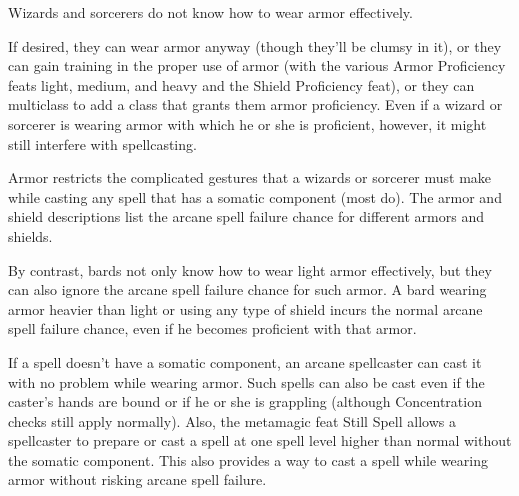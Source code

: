 Wizards and sorcerers do not know how to wear armor effectively.

If desired, they can wear armor anyway (though they'll be clumsy in it), or they can gain training in the proper use of armor (with the various Armor Proficiency feats light, medium, and heavy and the Shield Proficiency feat), or they can multiclass to add a class that grants them armor proficiency. Even if a wizard or sorcerer is wearing armor with which he or she is proficient, however, it might still interfere with spellcasting.

Armor restricts the complicated gestures that a wizards or sorcerer must make while casting any spell that has a somatic component (most do). The armor and shield descriptions list the arcane spell failure chance for different armors and shields.

By contrast, bards not only know how to wear light armor effectively, but they can also ignore the arcane spell failure chance for such armor. A bard wearing armor heavier than light or using any type of shield incurs the normal arcane spell failure chance, even if he becomes proficient with that armor.

If a spell doesn't have a somatic component, an arcane spellcaster can cast it with no problem while wearing armor. Such spells can also be cast even if the caster's hands are bound or if he or she is grappling (although Concentration checks still apply normally). Also, the metamagic feat Still Spell allows a spellcaster to prepare or cast a spell at one spell level higher than normal without the somatic component. This also provides a way to cast a spell while wearing armor without risking arcane spell failure. 